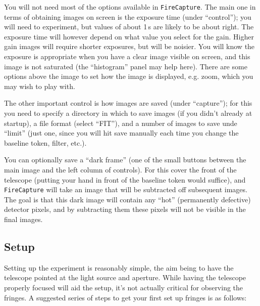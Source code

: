 \documentclass[11pt]{article}
\begin{document}
You will not need most of the options available in \texttt{FireCapture}. The main one in terms of obtaining images on screen is the exposure time (under ``control''); you will need to experiment, but values of about 1\,s are likely to be about right. The exposure time will however depend on what value you select for the gain. Higher gain images will require shorter exposures, but will be noisier. You will know the exposure is appropriate when you have a clear image visible on screen, and this image is not saturated (the ``histogram'' panel may help here). There are some options above the image to set how the image is displayed, e.g. zoom, which you may wish to play with.

The other important control is how images are saved (under ``capture''); for this you need to specify a directory in which to save images (if you didn't already at startup), a file format (select ``FIT''), and a number of images to save unde ``limit'' (just one, since you will hit save manually each time you change the baseline token, filter, etc.).

You can optionally save a ``dark frame'' (one of the small buttons between the main image and the left column of controls). For this cover the front of the telescope (putting your hand in front of the baseline token would suffice), and \texttt{FireCapture} will take an image that will be subtracted off subsequent images. The goal is that this dark image will contain any ``hot'' (permanently defective) detector pixels, and by subtracting them these pixels will not be visible in the final images.

\subsection{Setup}

Setting up the experiment is reasonably simple, the aim being to have the telescope pointed at the light source and aperture. While having the telescope properly focused will aid the setup, it's not actually critical for observing the fringes. A suggested series of steps to get your first set up fringes is as follows:
\end{document}
